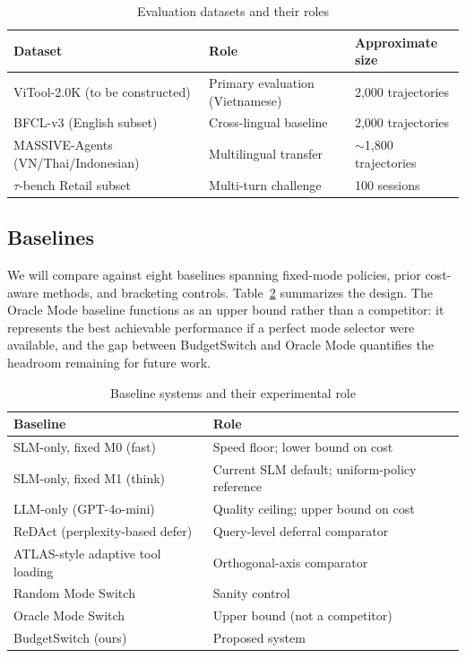 \documentclass[11pt,a4paper]{article}
\begin{document}
\begin{table}[h]
\caption{Evaluation datasets and their roles}
\label{tab:datasets}
\centering
\begin{tabular}{lll}
\toprule
Dataset & Role & Approximate size \\
\midrule
ViTool-2.0K (to be constructed) & Primary evaluation (Vietnamese) & 2{,}000 trajectories \\
BFCL-v3 (English subset) & Cross-lingual baseline & 2{,}000 trajectories \\
MASSIVE-Agents (VN/Thai/Indonesian) & Multilingual transfer & $\sim$1{,}800 trajectories \\
$\tau$-bench Retail subset & Multi-turn challenge & 100 sessions \\
\bottomrule
\end{tabular}
\end{table}

\subsection{Baselines}

We will compare against eight baselines spanning fixed-mode policies, prior cost-aware methods, and bracketing controls. Table~\ref{tab:baselines} summarizes the design. The Oracle Mode baseline functions as an upper bound rather than a competitor: it represents the best achievable performance if a perfect mode selector were available, and the gap between BudgetSwitch and Oracle Mode quantifies the headroom remaining for future work.

\begin{table}[h]
\caption{Baseline systems and their experimental role}
\label{tab:baselines}
\centering
\begin{tabular}{ll}
\toprule
Baseline & Role \\
\midrule
SLM-only, fixed M0 (fast) & Speed floor; lower bound on cost \\
SLM-only, fixed M1 (think) & Current SLM default; uniform-policy reference \\
LLM-only (GPT-4o-mini) & Quality ceiling; upper bound on cost \\
ReDAct (perplexity-based defer)~\cite{redact} & Query-level deferral comparator \\
ATLAS-style adaptive tool loading~\cite{atlas} & Orthogonal-axis comparator \\
Random Mode Switch & Sanity control \\
Oracle Mode Switch & Upper bound (not a competitor) \\
BudgetSwitch (ours) & Proposed system \\
\bottomrule
\end{tabular}
\end{table}
\end{document}
